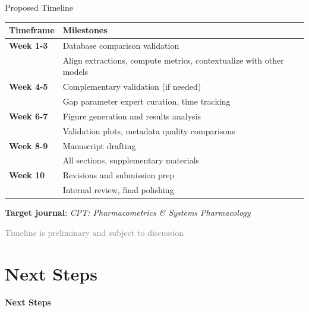 \documentclass[10pt]{beamer}
\begin{document}
\begin{frame}{Proposed Timeline}

  \begin{table}
    \centering
    \small
    \begin{tabular}{lp{6cm}}
      \toprule
      \textbf{Timeframe} & \textbf{Milestones} \\
      \midrule
      \textbf{Week 1-3} & Database comparison validation\\
                        & Align extractions, compute metrics, contextualize with other models \\
      \midrule
      \textbf{Week 4-5} & Complementary validation (if needed)\\
                        & Gap parameter expert curation, time tracking \\
      \midrule
      \textbf{Week 6-7} & Figure generation and results analysis\\
                        & Validation plots, metadata quality comparisons \\
      \midrule
      \textbf{Week 8-9} & Manuscript drafting\\
                        & All sections, supplementary materials \\
      \midrule
      \textbf{Week 10} & Revisions and submission prep\\
                        & Internal review, final polishing \\
      \bottomrule
    \end{tabular}
  \end{table}

  \vspace{0.3cm}

  \textbf{Target journal}: \emph{CPT: Pharmacometrics \& Systems Pharmacology}

  \vspace{0.2cm}

  \textcolor{gray}{\footnotesize Timeline is preliminary and subject to discussion}

\end{frame}

\section{Next Steps}

\begin{frame}[plain,c]
  \begin{center}
    \Huge\textbf{Next Steps}
  \end{center}
\end{frame}
\end{document}
